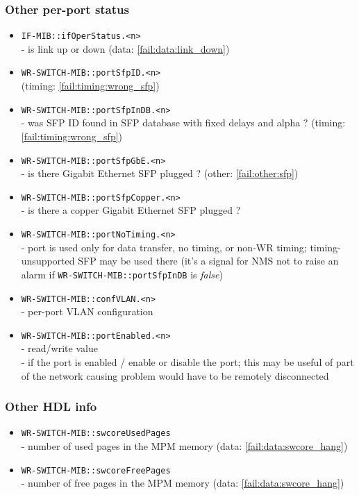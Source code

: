 \subsubsection{Other per-port status}
\begin{itemize}[leftmargin=0pt]
	\item [] \texttt{IF-MIB::ifOperStatus.<n>}\\ - is link up or down (data:
		\ref{fail:data:link_down})
	\item [] \texttt{WR-SWITCH-MIB::portSfpID.<n>}\\ (timing:
		\ref{fail:timing:wrong_sfp})
	\item [] \texttt{WR-SWITCH-MIB::portSfpInDB.<n>}\\ - was SFP ID found in SFP
		database with fixed delays and alpha ? (timing: \ref{fail:timing:wrong_sfp})
	\item [] \texttt{WR-SWITCH-MIB::portSfpGbE.<n>}\\ - is there Gigabit Ethernet
		SFP plugged ? (other: \ref{fail:other:sfp})
	\item [] \texttt{WR-SWITCH-MIB::portSfpCopper.<n>}\\ - is there a copper Gigabit
		Ethernet SFP plugged ?
	\item [] \texttt{WR-SWITCH-MIB::portNoTiming.<n>}\\ - port is used only for data
		transfer, no timing, or non-WR timing; timing-unsupported SFP may be used
		there (it's a signal for NMS not to raise an alarm if
		\texttt{WR-SWITCH-MIB::portSfpInDB} is \emph{false})
	\item [] \texttt{WR-SWITCH-MIB::confVLAN.<n>}\\ - per-port VLAN configuration
	\item [] \texttt{WR-SWITCH-MIB::portEnabled.<n>}\\
		- read/write value\\
		- if the port is enabled / enable or disable the port; this may be useful of
		part of the network causing problem would have to be remotely disconnected
\end{itemize}

\subsubsection{Other HDL info}
\begin{itemize}[leftmargin=0pt]
	\item [] \texttt{WR-SWITCH-MIB::swcoreUsedPages}\\ - number of used pages in
		the MPM memory (data: \ref{fail:data:swcore_hang})
	\item [] \texttt{WR-SWITCH-MIB::swcoreFreePages}\\ - number of free pages in
		the MPM memory (data: \ref{fail:data:swcore_hang})
\end{itemize}

